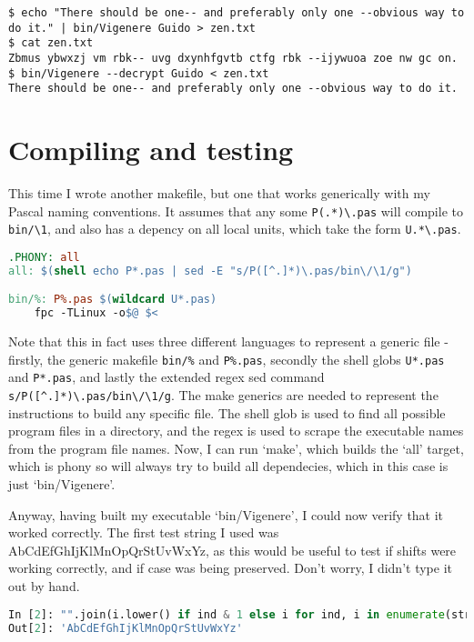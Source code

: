 \documentclass{article}
\begin{document}
\begin{lstlisting}[caption=Use of an output file]
$ echo "There should be one-- and preferably only one --obvious way to do it." | bin/Vigenere Guido > zen.txt
$ cat zen.txt 
Zbmus ybwxzj vm rbk-- uvg dxynhfgvtb ctfg rbk --ijywuoa zoe nw gc on.
$ bin/Vigenere --decrypt Guido < zen.txt
There should be one-- and preferably only one --obvious way to do it.
\end{lstlisting}
\iffalse $ \fi %

    \section{Compiling and testing}

    This time I wrote another makefile, but one that works generically with my
    Pascal naming conventions. It assumes that any some \verb|P(.*)\.pas| will
    compile to \verb|bin/\1|, and also has a depency on all local units, which
    take the form \verb|U.*\.pas|.

\begin{lstlisting}[language=make, caption=The generic FPC makefile]
.PHONY: all
all: $(shell echo P*.pas | sed -E "s/P([^.]*)\.pas/bin\/\1/g")

bin/%: P%.pas $(wildcard U*.pas)
	fpc -TLinux -o$@ $<
\end{lstlisting}
\iffalse $ \fi %

    Note that this in fact uses three different languages to represent a
    generic file - firstly, the generic makefile \verb|bin/%| and
    \verb|P%.pas|, secondly the shell globs \verb|U*.pas| and \verb|P*.pas|,
    and lastly the extended regex sed command \verb|s/P([^.]*)\.pas/bin\/\1/g|.
    The make generics are needed to represent the instructions to build any
    specific file. The shell glob is used to find all possible program files in
    a directory, and the regex is used to scrape the executable names from the
    program file names. Now, I can run `make', which builds the `all' target,
    which is phony so will always try to build all dependecies, which in this
    case is just `bin/Vigenere'.

    Anyway, having built my executable `bin/Vigenere', I could now verify that
    it worked correctly. The first test string I used was
    AbCdEfGhIjKlMnOpQrStUvWxYz, as this would be useful to test if shifts were
    working correctly, and if case was being preserved. Don't worry, I didn't
    type it out by hand.

\begin{lstlisting}[language=Python, caption=Alphabet]
In [2]: "".join(i.lower() if ind & 1 else i for ind, i in enumerate(string.ascii_uppercase))
Out[2]: 'AbCdEfGhIjKlMnOpQrStUvWxYz'
\end{lstlisting}
    
\end{document}
